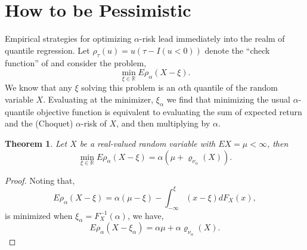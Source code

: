 \documentclass{birkart}
\newtheorem{theorem}{Theorem}[section]
\theoremstyle{definition}
\theoremstyle{remark}
\numberwithin{equation}{section}
\def\RR{\mathbb{R}}
\begin{document}
\section{How to be Pessimistic}

Empirical strategies for optimizing $\alpha$-risk lead immediately into the 
realm of quantile regression.  Let $ \rho_\tau(u) = u(\tau - I(u<0))$ 
denote the ``check function'' of  and consider the
problem,
$$
\min_{\xi \in \RR}  E\rho_\alpha (X-\xi) .
$$
We know that any $\xi$ solving this problem is an $\alpha$th quantile of the
random variable $X$.  
Evaluating at the minimizer, $\xi_\alpha$ we find that
minimizing the usual $\alpha$-quantile objective function
is equivalent to evaluating the sum of expected return
and the (Choquet) $\alpha$-risk of $X$, and then multiplying by $\alpha$.

\begin{theorem}
Let $X$ be a real-valued random variable with $EX = \mu < \infty$, then
\[
\min_{\xi \in \RR}  E\rho_\alpha (X-\xi) = \alpha ( \mu + \varrho_{\nu_\alpha} (X)).
\]
\end{theorem}
\begin{proof}
Noting that,
\[
E\rho_\alpha (X-\xi) = \alpha ( \mu - \xi ) - 
\int_{-\infty}^\xi (x - \xi)dF_X (x),
\]
is minimized when $\xi_\alpha = F_X^{-1} (\alpha)$, we have,
\[
E\rho_\alpha (X-\xi_\alpha ) = \alpha  \mu + \alpha \varrho_{\nu_\alpha} (X).
\]
\end{proof}
\end{document}

